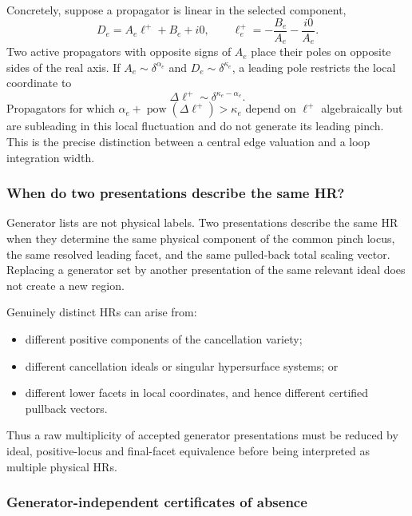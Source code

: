 \documentclass[a4paper,11pt]{article}
\begin{document}
Concretely, suppose a propagator is linear in the selected component,
\begin{equation}
 D_e=A_e\ell^+ +B_e+i0,
 \qquad
 \ell_e^+=-\frac{B_e}{A_e}-\frac{i0}{A_e}.
 \label{eq:light-cone-pole-rule}
\end{equation}
Two active propagators with opposite signs of \(A_e\) place their poles on
opposite sides of the real axis.  If
\(A_e\sim\delta^{\alpha_e}\) and
\(D_e\sim\delta^{\kappa_e}\), a leading pole restricts the local coordinate
to
\begin{equation}
 \Delta\ell^+\sim\delta^{\kappa_e-\alpha_e}.
 \label{eq:light-cone-pinch-width}
\end{equation}
Propagators for which
\(\alpha_e+\operatorname{pow}(\Delta\ell^+)>\kappa_e\) depend on
\(\ell^+\) algebraically but are subleading in this local fluctuation and do
not generate its leading pinch.  This is the precise distinction between a
central edge valuation and a loop integration width.

\subsubsection{When do two presentations describe the same HR?}
\label{sec:equivalence}

Generator lists are not physical labels.  Two presentations describe the
same HR when they determine the same physical component of the common pinch
locus, the same resolved leading facet, and the same pulled-back total
scaling vector.  Replacing a generator set by another presentation of the
same relevant ideal does not create a new region.

Genuinely distinct HRs can arise from:
\begin{itemize}
\item different positive components of the cancellation variety;
\item different cancellation ideals or singular hypersurface systems; or
\item different lower facets in local coordinates, and hence different
      certified pullback vectors.
\end{itemize}
Thus a raw multiplicity of accepted generator presentations must be reduced
by ideal, positive-locus and final-facet equivalence before being interpreted
as multiple physical HRs.

\subsubsection{Generator-independent certificates of absence}
\label{sec:absence}
\end{document}
